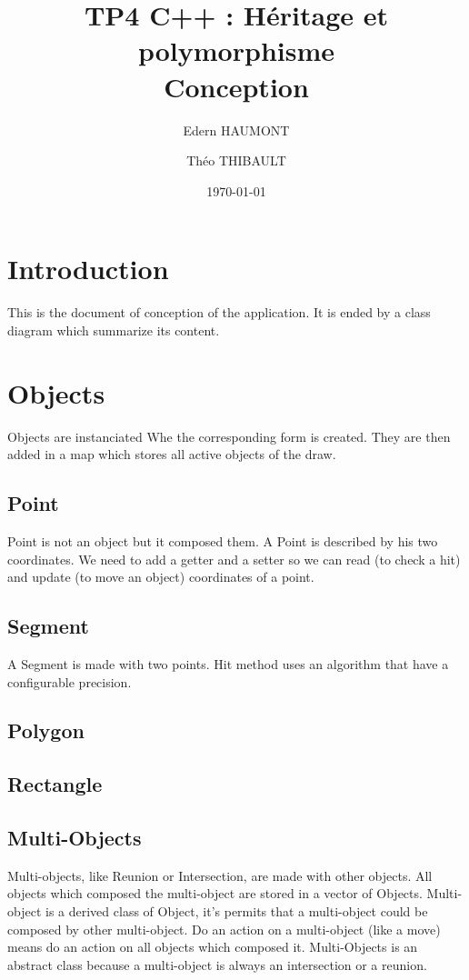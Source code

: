 \documentclass[a4paper, 12pts]{article}
\title{TP4 C++ : Héritage et polymorphisme \\
    \large Conception}
\author{Edern HAUMONT}
\author{Théo THIBAULT}
\affil{B3133}
\date{\today}
\begin{document}

\maketitle



\section{Introduction}
	This is the document of conception of the application. It is ended by a class diagram which summarize its content.

\section{Objects}
    Objects are instanciated Whe the corresponding form is created. They are then added in a map which stores all active objects of the draw.
    \subsection{Point}
        Point is not an object but it composed them. A Point is described by his two coordinates. We need to add a getter and
        a setter so we can read (to check a hit) and update (to move an object) coordinates of a point.
    \subsection{Segment}
        A Segment is made with two points.
        Hit method uses an algorithm that have a configurable precision.
    \subsection{Polygon}
    \subsection{Rectangle}
    \subsection{Multi-Objects}
        Multi-objects, like Reunion or Intersection, are made with other objects. All objects which composed the multi-object are
        stored in a vector of Objects. Multi-object is a derived class of Object, it's permits that a multi-object could be composed
        by other multi-object. Do an action on a multi-object (like a move) means do an action on all objects which composed it.
        Multi-Objects is an abstract class because a multi-object is always an intersection or a reunion.
\end{document}
